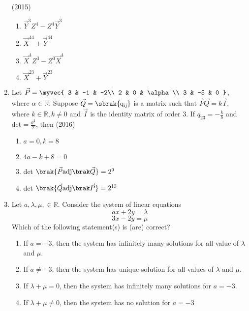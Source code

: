 \begin{enumerate}[label=\thesubsection.\arabic*.,ref=\thesubsection.\theenumi]
        \hfill (2015)
\begin{multicols}{4}
        \begin{enumerate}
            \item $\vec{Y}^3Z^4 -Z^4\vec{Y}^3$
            \item $\vec{X}^{44} + \vec{Y}^{44}$
            \item $\vec{X}^4Z^3 -Z^3\vec{X}^4$
            \item $\vec{X}^{23} + \vec{Y}^{23}$
        \end{enumerate}
\end{multicols}
    \item 
        Let $\vec{P} = 
            \myvec{		
                3 & -1 & -2\\
                2 & 0 & \alpha\\
                3 & -5 & 0
            }$,
        where $\alpha \in \mathbb{R}$. Suppose $\vec{Q}= \mathrm{\sbrak{q_{ij}}}$ is a matrix such that $\vec{P}\vec{Q}=k\vec{I}$, where $k \in \mathbb{R}, k \neq 0$ and $\vec{I}$ is the identity matrix of order $3$. If $q_{23} = -\frac{k}{8}$ and det$= \frac{k^2}{2}$, then
        \hfill (2016)
\begin{multicols}{2}
        \begin{enumerate}
            \item $a=0, k=8$
            \item $4a-k+8=0$
            \item det $\brak{\vec{P} \adj{\vec{Q}}} = 2^9$
            \item det $\brak{\vec{Q} \adj{\vec{P}}} = 2^{13}$
        \end{enumerate}
\end{multicols}
    \item
        Let $a, \lambda, \mu, \in \mathbb{R}$. Consider the system of linear equations $$ax+2y=\lambda$$ $$3x-2y=\mu$$ Which of the following statement(s) is (are) correct?
        \begin{enumerate}
            \item If $a=-3$, then the system has infinitely many solutions for all value of $\lambda$ and $\mu$.
            \item If $a \neq -3$, then the system has unique solution for all values of $\lambda$ and $\mu$.
            \item If $\lambda + \mu = 0$, then the system has infinitely many solutions for $a = -3$.
            \item If $\lambda + \mu \neq 0$, then the system has no solution for $a = -3$

\end{enumerate}
\end{enumerate}
